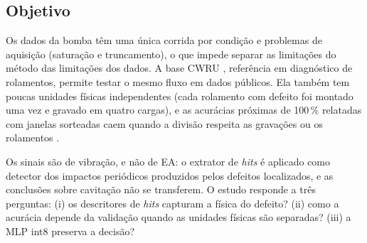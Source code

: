 \subsection{Objetivo}
\label{cwru:sec:objetivo}

Os dados da bomba têm uma única corrida por condição e problemas de aquisição (saturação e truncamento), o que impede separar as limitações do método das limitações dos dados. A base CWRU \cite{cwru}, referência em diagnóstico de rolamentos, permite testar o mesmo fluxo em dados públicos. Ela também tem poucas unidades físicas independentes (cada rolamento com defeito foi montado uma vez e gravado em quatro cargas), e as acurácias próximas de 100\,\% relatadas com janelas sorteadas caem quando a divisão respeita as gravações ou os rolamentos \cite{smith2015,rauber2021,hendriks2022}.

Os sinais são de vibração, e não de EA: o extrator de \textit{hits} é aplicado como detector dos impactos periódicos produzidos pelos defeitos localizados, e as conclusões sobre cavitação não se transferem. O estudo responde a três perguntas: (i) os descritores de \textit{hits} capturam a física do defeito? (ii) como a acurácia depende da validação quando as unidades físicas são separadas? (iii) a MLP int8 preserva a decisão?
